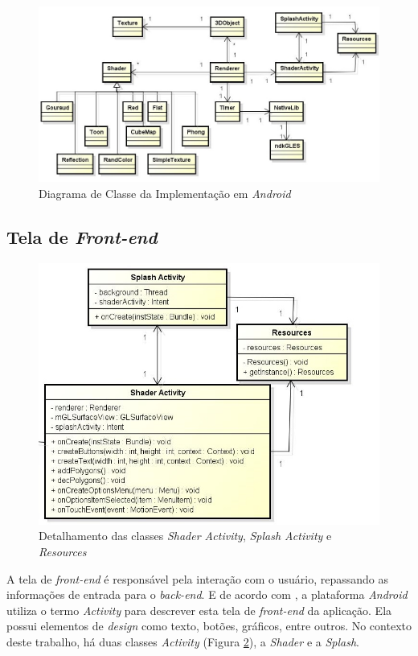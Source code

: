 	\begin{figure}[ht]
	\centering
		\includegraphics[keepaspectratio=true,scale=0.6]{figuras/class_diagram.jpg}
	\caption{Diagrama de Classe da Implementação em \textit{Android}}
	\label{class_diagram}
	\end{figure}

\subsection{Tela de \textit{Front-end}}

	\begin{figure}[ht]
	\centering
		\includegraphics[keepaspectratio=true,scale=0.6]{figuras/shader_splash.jpg}
	\caption{Detalhamento das classes \textit{Shader Activity}, \textit{Splash Activity} e \textit{Resources}}
	\label{shader_splash}
	\end{figure}

	A tela de \textit{front-end} é responsável pela interação com o usuário, repassando as informações de entrada para o \textit{back-end}. E de acordo com \cite{androidsdkmanager}, a plataforma \textit{Android} utiliza o termo \textit{Activity} para descrever esta tela de \textit{front-end} da aplicação. Ela possui elementos de \textit{design} como texto, botões, gráficos, entre outros. No contexto deste trabalho, há duas classes \textit{Activity} (Figura \ref{shader_splash}), a \textit{Shader} e a \textit{Splash}. 

